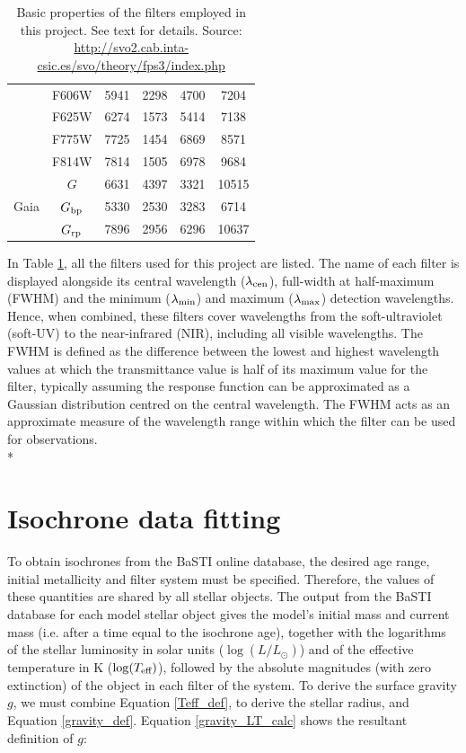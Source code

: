 \documentclass[12pt, a4paper]{report}
\begin{document}
\begin{table}
\begin{center}
\begin{tabular}{cccccc}
& F606W & 5941 & 2298 & 4700 & 7204 \\ %
& F625W & 6274 & 1573 & 5414 & 7138 \\ %
& F775W & 7725 & 1454 & 6869 & 8571 \\ %
& F814W & 7814 & 1505 & 6978 & 9684 \\ %
\hline
& $G$ & 6631 & 4397 & 3321 & 10515 \\ %
Gaia & $G_{\textnormal{bp}}$ & 5330 & 2530 & 3283 & 6714 \\ %
& $G_{\textnormal{rp}}$ & 7896 & 2956 & 6296 & 10637 \\ %
\hline

\end{tabular}
\caption{Basic properties of the filters employed in this project. See text for details. Source: \protect\url{http://svo2.cab.inta-csic.es/svo/theory/fps3/index.php}}
\label{filter_basics}
\end{center}
\end{table}

In Table \ref{filter_basics}, all the filters used for this project are listed. The name of each filter is displayed alongside its central wavelength ($\lambda_{\textnormal{cen}}$), full-width at half-maximum (FWHM) and the minimum ($\lambda_{\textnormal{min}}$) and maximum ($\lambda_{\textnormal{max}}$) detection wavelengths. Hence, when combined, these filters cover wavelengths from the soft-ultraviolet (soft-UV) to the near-infrared (NIR), including all visible wavelengths. The FWHM is defined as the difference between the lowest and highest wavelength values at which the transmittance value is half of its maximum value for the filter, typically assuming the response function can be approximated as a Gaussian distribution centred on the central wavelength. The FWHM acts as an approximate measure of the wavelength range within which the filter can be used for observations.\\*

\section{Isochrone data fitting} \label{isoc_fit}
To obtain isochrones from the BaSTI online database, the desired age range, initial metallicity and filter system must be specified. Therefore, the values of these quantities are shared by all stellar objects. The output from the BaSTI database for each model stellar object gives the model's initial mass and current mass (i.e. after a time equal to the isochrone age), together with the logarithms of the stellar luminosity in solar units ($\log(L/L_{\odot})$) and of the effective temperature in K ($\log(T_{\textnormal{eff}})$), followed by the absolute magnitudes (with zero extinction) of the object in each filter of the system. To derive the surface gravity $g$, we must combine Equation \ref{Teff_def}, to derive the stellar radius, and Equation \ref{gravity_def}. Equation \ref{gravity_LT_calc} shows the resultant definition of $g$:
\end{document}
